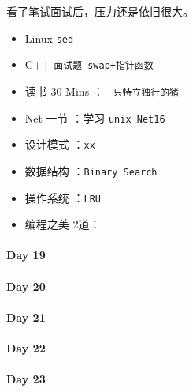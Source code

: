 \documentclass[UTF8,a4paper,8pt]{ctexart}
\begin{document}
	 	 看了笔试面试后，压力还是依旧很大。
	 	 \begin{itemize}[itemindent = 1em]
	 	 	\renewcommand\labelitemi{\makebox[0pt][l]{$\square$}\hspace{1em}} 
	 	 	\renewcommand\labelitemi{\makebox[0pt][l]{$\square$}\raisebox{.15ex}{\hspace{0.1em}$\checkmark$}}	 	
	 	 	\item   Linux \verb|sed|
	 	 	\item   C++   \verb|面试题-swap+指针函数|
	 	 	
	 	 	\item   读书  30 Mins	：\verb|一只特立独行的猪|
	 	 	\item   Net 一节 ：学习 \verb|unix Net16|	
	 	 	
	 	 	\renewcommand\labelitemi{\makebox[0pt][l]{$\square$}\hspace{1em}}
	 	 	\item   设计模式 ：\verb|xx| 
	 	 	\item   数据结构 ：\verb|Binary Search| 
	 	 	\item   操作系统 ：\verb|LRU|
	 	 	\item   编程之美 2道： 
	 	 \end{itemize}
 	 \paragraph{Day 19      \quad     }
 	 \paragraph{Day 20      \quad     }
 	 \paragraph{Day 21      \quad     }
 	 \paragraph{Day 22      \quad     }
 	 \paragraph{Day 23      \quad     }
\end{document}
